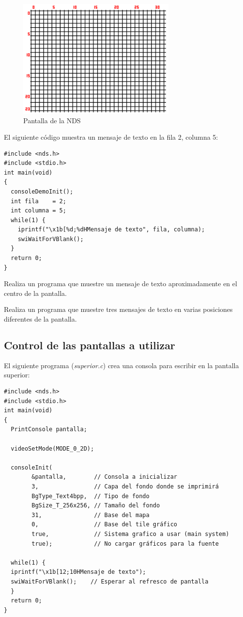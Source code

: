 \begin{figure}[t]
\centering
\includegraphics[height=6cm]{Figuras/C3/c3_eclipse12.png}
\caption{Pantalla de la NDS}
\label{fig_c3_texto}
\end{figure}

\begin{example}
El siguiente código muestra un mensaje de texto en la fila 2, columna 5:
\begin{lstlisting}
#include <nds.h>
#include <stdio.h>
int main(void)
{
  consoleDemoInit(); 
  int fila    = 2;
  int columna = 5;
  while(1) {
  	iprintf("\x1b[%d;%dHMensaje de texto", fila, columna);
  	swiWaitForVBlank();  
  }
  return 0;
}
\end{lstlisting}
\end{example}

\begin{exercise}
Realiza un programa que muestre un mensaje de texto aproximadamente en el centro de la pantalla. 
\end{exercise}

\begin{exercise}
Realiza un programa que muestre tres mensajes de texto en varias posiciones diferentes de la pantalla. 
\end{exercise}

\subsection{Control de las pantallas a utilizar}
El siguiente programa (\textit{superior.c}) crea una consola para escribir en la pantalla superior:
\begin{lstlisting}
#include <nds.h>
#include <stdio.h>
int main(void)
{
  PrintConsole pantalla;

  videoSetMode(MODE_0_2D);

  consoleInit(
  		&pantalla,        // Consola a inicializar
	    3,                // Capa del fondo donde se imprimirá
	    BgType_Text4bpp,  // Tipo de fondo
	    BgSize_T_256x256, // Tamaño del fondo
	    31,               // Base del mapa
	    0,                // Base del tile gráfico
	    true,             // Sistema grafico a usar (main system)
	    true);            // No cargar gráficos para la fuente

  while(1) {
  iprintf("\x1b[12;10HMensaje de texto");
  swiWaitForVBlank();    // Esperar al refresco de pantalla
  }
  return 0;
}
\end{lstlisting}

